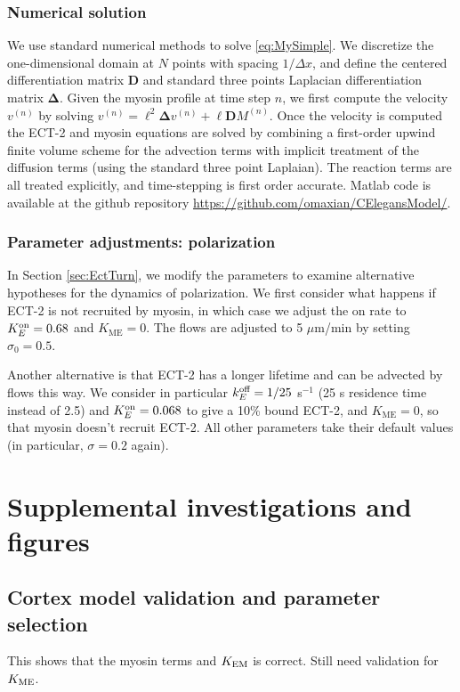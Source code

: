 \documentclass[11pt]{article}
\newcommand{\red}[1]{\color{red}#1\normalcolor}
\newcommand{\M}[1]{\boldsymbol{#1}}
\begin{document}
\begin{appendix}
\subsubsection{Numerical solution}
We use standard numerical methods to solve \eqref{eq:MySimple}. We discretize the one-dimensional domain at $N$ points with spacing $1/\Delta x$, and define the centered differentiation matrix $\M{D}$ and standard three points Laplacian differentiation matrix $\M{\Delta}$. Given the myosin profile at time step $n$, we first compute the velocity $v^{(n)}$ by solving $v^{(n)} = \ell^2 \M{\Delta} v^{(n)} + \ell \M{D} M^{(n)}$. Once the velocity is computed the ECT-2 and myosin equations are solved by combining a first-order upwind finite volume scheme for the advection terms \citep[Sec.~1.4]{hundsdorfer2003numerical} with implicit treatment of the diffusion terms (using the standard three point Laplaian). The reaction terms are all treated explicitly, and time-stepping is first order accurate. Matlab code  is available at the github repository \url{https://github.com/omaxian/CElegansModel/}.

\subsubsection{Parameter adjustments: polarization \label{sec:EctTurnP}}
In Section \ref{sec:EctTurn}, we modify the parameters to examine alternative hypotheses for the dynamics of polarization. We first consider what happens if ECT-2 is not recruited by myosin, in which case we adjust the on rate to $K^\text{on}_E=0.68$ and $K_\text{ME}=0$. The flows are adjusted to 5 $\mu$m/min by setting $\sigma_0=0.5$. 

Another alternative is that ECT-2 has a longer lifetime and can be advected by flows this way. We consider in particular $k^\text{off}_E=1/25$ s$^{-1}$ (25 s residence time instead of 2.5) and $K^\text{on}_E=0.068$ to give a 10\% bound ECT-2, and $K_\text{ME}=0$, so that myosin doesn't recruit ECT-2. All other parameters take their default values (in particular, $\sigma=0.2$ again). 

\section{Supplemental investigations and figures}
\subsection{Cortex model validation and parameter selection}
This shows that the myosin terms and $K_\text{EM}$ is correct. \red{Still need validation for $K_\text{ME}$.}


\end{appendix}
\end{document}
